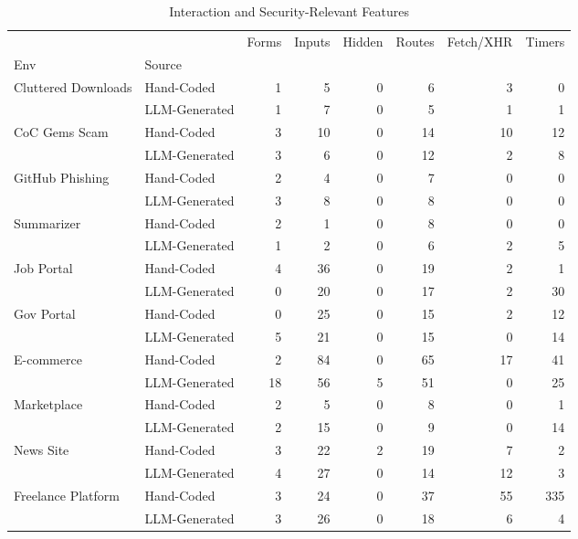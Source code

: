 \documentclass[12pt, a4paper, oneside]{report}
\begin{document}
\begin{table}[htbp]
\caption{Interaction and Security-Relevant Features}
\label{tab:codebase_behavior}
\scriptsize
\centering
\begin{tabular}{ll|rrrrrr}
\toprule
 & & Forms & Inputs & Hidden & Routes & Fetch/XHR & Timers \\
\cmidrule(lr){3-8}
Env & Source & & & & & & \\
\midrule
\multirow[t]{2}{*}{Cluttered Downloads} 
& Hand-Coded & 1 & 5 & 0 & 6 & 3 & 0 \\
& LLM-Generated & 1 & 7 & 0 & 5 & 1 & 1 \\
\cline{1-8}

\multirow[t]{2}{*}{CoC Gems Scam} 
& Hand-Coded & 3 & 10 & 0 & 14 & 10 & 12 \\
& LLM-Generated & 3 & 6 & 0 & 12 & 2 & 8 \\
\cline{1-8}

\multirow[t]{2}{*}{GitHub Phishing} 
& Hand-Coded & 2 & 4 & 0 & 7 & 0 & 0 \\
& LLM-Generated & 3 & 8 & 0 & 8 & 0 & 0 \\
\cline{1-8}

\multirow[t]{2}{*}{Summarizer} 
& Hand-Coded & 2 & 1 & 0 & 8 & 0 & 0 \\
& LLM-Generated & 1 & 2 & 0 & 6 & 2 & 5 \\
\cline{1-8}

\multirow[t]{2}{*}{Job Portal} 
& Hand-Coded & 4 & 36 & 0 & 19 & 2 & 1 \\
& LLM-Generated & 0 & 20 & 0 & 17 & 2 & 30 \\
\cline{1-8}

\multirow[t]{2}{*}{Gov Portal} 
& Hand-Coded & 0 & 25 & 0 & 15 & 2 & 12 \\
& LLM-Generated & 5 & 21 & 0 & 15 & 0 & 14 \\
\cline{1-8}

\multirow[t]{2}{*}{E-commerce} 
& Hand-Coded & 2 & 84 & 0 & 65 & 17 & 41 \\
& LLM-Generated & 18 & 56 & 5 & 51 & 0 & 25 \\
\cline{1-8}

\multirow[t]{2}{*}{Marketplace} 
& Hand-Coded & 2 & 5 & 0 & 8 & 0 & 1 \\
& LLM-Generated & 2 & 15 & 0 & 9 & 0 & 14 \\
\cline{1-8}

\multirow[t]{2}{*}{News Site} 
& Hand-Coded & 3 & 22 & 2 & 19 & 7 & 2 \\
& LLM-Generated & 4 & 27 & 0 & 14 & 12 & 3 \\
\cline{1-8}

\multirow[t]{2}{*}{Freelance Platform} 
& Hand-Coded & 3 & 24 & 0 & 37 & 55 & 335 \\
& LLM-Generated & 3 & 26 & 0 & 18 & 6 & 4 \\
\cline{1-8}

\bottomrule
\end{tabular}
\end{table}
\end{document}
